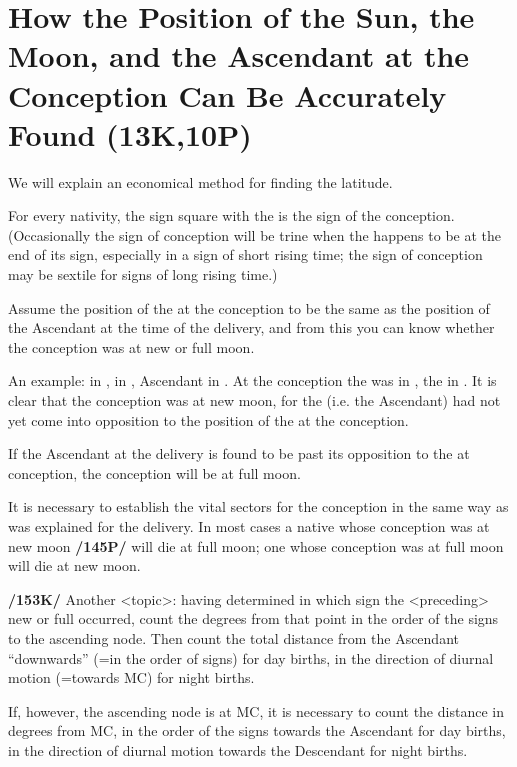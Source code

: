 \section{How the Position of the Sun, the Moon, and the Ascendant at the Conception Can Be Accurately Found (13K,10P)}
We will explain an economical method for finding the latitude. 

For every nativity, the sign square with the \Sun\xspace is the sign of the conception. (Occasionally the sign of conception will be trine when the \Sun\xspace happens to be at the end of its sign, especially in a sign of short rising time; the sign of conception may be sextile for signs of long rising time.) 

Assume the position of the \Moon\xspace at the conception to be the same as the position of the Ascendant at the time of the delivery, and from this you can know whether the conception was at new or full moon.

An example: \Sun\xspace in \Aquarius, \Moon\xspace in \Scorpio, Ascendant in \Virgo. At the conception the \Sun\xspace was
in \Taurus, the \Moon\xspace in \Virgo. It is clear that the conception was at new moon, for the \Moon\xspace (i.e. the
Ascendant) had not yet come into opposition to the position of the \Sun\xspace at the conception. 

If the Ascendant at the delivery is found to be past its opposition to the \Sun\xspace at conception, the conception will be at full moon.

It is necessary to establish the vital sectors for the conception in the same way as was explained for the delivery.  In most cases a native whose conception was at new moon \textbf{/145P/} will die at full moon; one whose conception was at full moon will die at new moon.

\textbf{/153K/} Another <topic>: having determined in which sign the <preceding> new or full \Moon\xspace occurred, count the degrees from that point in the order of the signs to the ascending node. Then count the total distance from the Ascendant “downwards” (=in the order of signs) for day births, in the direction of diurnal motion (=towards MC) for night births. 

If, however, the ascending node is at MC, it is necessary to count the distance in degrees from MC, in the order of the signs towards the Ascendant for day births, in the direction of diurnal motion towards the Descendant for night births. 

